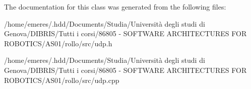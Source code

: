 The documentation for this class was generated from the following files\+:\begin{DoxyCompactItemize}
\item 
/home/emeres/.\+hdd/\+Documents/\+Studia/\+Università degli studi di Genova/\+D\+I\+B\+R\+I\+S/\+Tutti i corsi/86805 -\/ S\+O\+F\+T\+W\+A\+R\+E A\+R\+C\+H\+I\+T\+E\+C\+T\+U\+R\+E\+S F\+O\+R R\+O\+B\+O\+T\+I\+C\+S/\+A\+S01/rollo/src/udp.\+h\item 
/home/emeres/.\+hdd/\+Documents/\+Studia/\+Università degli studi di Genova/\+D\+I\+B\+R\+I\+S/\+Tutti i corsi/86805 -\/ S\+O\+F\+T\+W\+A\+R\+E A\+R\+C\+H\+I\+T\+E\+C\+T\+U\+R\+E\+S F\+O\+R R\+O\+B\+O\+T\+I\+C\+S/\+A\+S01/rollo/src/udp.\+cpp\end{DoxyCompactItemize}
